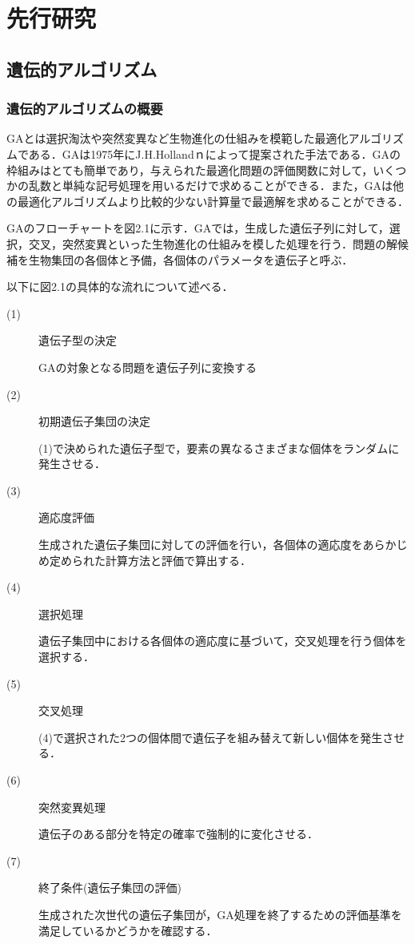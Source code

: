 \chapter{先行研究}
\thispagestyle{fancy} %
\lhead{}
\chead{}
\rhead{}
\lfoot{} 
\cfoot{\thepage}  
\rfoot{}
%

\section{遺伝的アルゴリズム}
\label{sec2.1}

\subsection{遺伝的アルゴリズムの概要}
\label{sec2.1.1}

GAとは選択淘汰や突然変異など生物進化の仕組みを模範した最適化アルゴリズムである．GAは1975年にJ.H.Hollandｎによって提案された手法である．GAの枠組みはとても簡単であり，与えられた最適化問題の評価関数に対して，いくつかの乱数と単純な記号処理を用いるだけで求めることができる．また，GAは他の最適化アルゴリズムより比較的少ない計算量で最適解を求めることができる．

GAのフローチャートを図2.1に示す．GAでは，生成した遺伝子列に対して，選択，交叉，突然変異といった生物進化の仕組みを模した処理を行う．問題の解候補を生物集団の各個体と予備，各個体のパラメータを遺伝子と呼ぶ．

以下に図2.1の具体的な流れについて述べる．

\begin{description}
\item[ (1) ]遺伝子型の決定

GAの対象となる問題を遺伝子列に変換する

\item[ (2) ]初期遺伝子集団の決定

(1)で決められた遺伝子型で，要素の異なるさまざまな個体をランダムに発生させる．

\item[ (3) ]適応度評価

生成された遺伝子集団に対しての評価を行い，各個体の適応度をあらかじめ定められた計算方法と評価で算出する．

\item[ (4) ]選択処理

遺伝子集団中における各個体の適応度に基づいて，交叉処理を行う個体を選択する．

\item[ (5) ]交叉処理

(4)で選択された2つの個体間で遺伝子を組み替えて新しい個体を発生させる．

\item[ (6) ]突然変異処理

遺伝子のある部分を特定の確率で強制的に変化させる．

\item[ (7) ]終了条件(遺伝子集団の評価)

生成された次世代の遺伝子集団が，GA処理を終了するための評価基準を満足しているかどうかを確認する．
\end{description}



